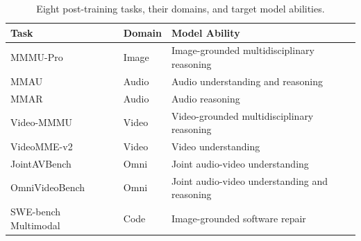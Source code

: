 \begin{table}[!htbp]
\centering\renewcommand{\arraystretch}{1.15}\small
\setlength{\tabcolsep}{4pt}
\caption{Eight post-training tasks, their domains, and target model abilities.}
\label{tab:tasks}
\begin{tabular}{@{}lll@{}}
\toprule
Task & Domain & Model Ability \\
\midrule
MMMU-Pro~\citep{mmmupro} & Image & Image-grounded multidisciplinary reasoning \\
\addlinespace[3pt]
MMAU~\citep{mmau} & Audio & Audio understanding and reasoning \\
MMAR~\citep{mmar} & Audio & Audio reasoning \\
\addlinespace[3pt]
Video-MMMU~\citep{videommmu} & Video & Video-grounded multidisciplinary reasoning \\
VideoMME-v2~\citep{videommev2} & Video & Video understanding \\
\addlinespace[3pt]
JointAVBench~\citep{jointavbench} & Omni & Joint audio-video understanding \\
OmniVideoBench~\citep{omnivideobench} & Omni & Joint audio-video understanding and reasoning \\
\addlinespace[3pt]
SWE-bench Multimodal~\citep{swebench_multimodal} & Code & Image-grounded software repair \\
\bottomrule
\end{tabular}
\end{table}

%
%
